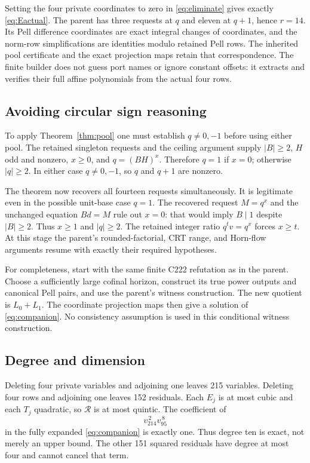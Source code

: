\documentclass[11pt,letterpaper]{article}
\theoremstyle{definition}\newtheorem{definition}[theorem]{Definition}
\theoremstyle{remark}\newtheorem{remark}[theorem]{Remark}
\begin{document}
Setting the four private coordinates to zero in
\eqref{eq:eliminate} gives exactly \eqref{eq:Eactual}. The parent has
three requests at $q$ and eleven at $q+1$, hence $r=14$. Its Pell
difference coordinates are exact integral changes of coordinates, and
the norm-row simplifications are identities modulo retained Pell rows.
The inherited pool certificate and the exact projection maps retain
that correspondence. The finite builder does not guess port names or
ignore constant offsets: it extracts and verifies their full affine
polynomials from the actual four rows.

\subsection{Avoiding circular sign reasoning}

To apply Theorem~\ref{thm:pool} one must establish $q\ne0,-1$ before
using either pool. The retained singleton requests and the ceiling
argument supply $|B|\ge2$, $H$ odd and nonzero, $x\ge0$, and
$q=(BH)^x$. Therefore $q=1$ if $x=0$; otherwise $|q|\ge2$.
In either case $q\ne0,-1$, so $q$ and $q+1$ are nonzero.

The theorem now recovers all fourteen requests simultaneously. It is
legitimate even in the possible unit-base case $q=1$. The recovered
request $M=q^x$ and the unchanged equation $Bd=M$ rule out $x=0$:
that would imply $B\mid1$ despite $|B|\ge2$. Thus $x\ge1$ and
$|q|\ge2$. The retained integer ratio $q^t v=q^x$ forces $x\ge t$.
At this stage the parent's rounded-factorial, CRT range, and Horn-flow
arguments resume with exactly their required hypotheses.

For completeness, start with the same finite C222 refutation as in the
parent. Choose a sufficiently large cofinal horizon, construct its true
power outputs and canonical Pell pairs, and use the parent's witness
construction. The new quotient is $L_0+L_1$. The coordinate projection
maps then give a solution of \eqref{eq:companion}. No consistency
assumption is used in this conditional witness construction.

\subsection{Degree and dimension}

Deleting four private variables and adjoining one leaves 215 variables.
Deleting four rows and adjoining one leaves 152 residuals. Each $E_j$
is at most cubic and each $T_j$ quadratic, so $\mathcal R$ is at most
quintic. The coefficient of
\[
 v_{214}^{\,2}v_{95}^{\,8}
\]
in the fully expanded \eqref{eq:companion} is exactly one. Thus degree
ten is exact, not merely an upper bound. The other 151 squared
residuals have degree at most four and cannot cancel that term.
\end{document}
